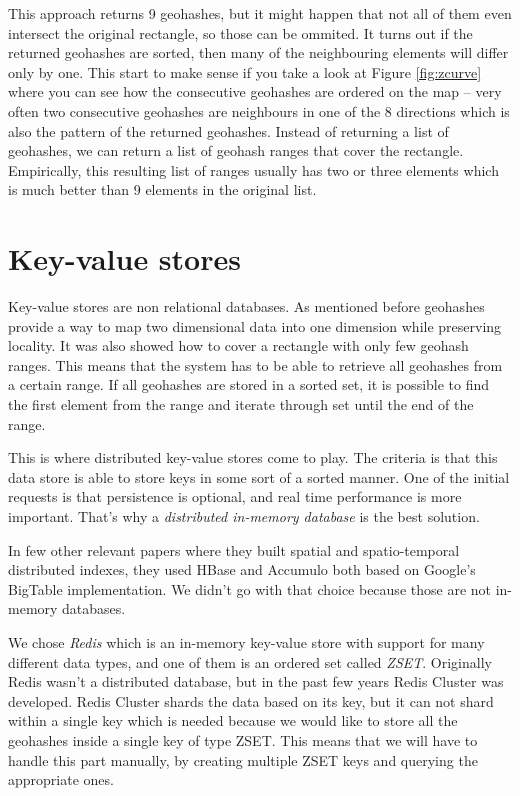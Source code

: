 \documentclass[times, utf8, diplomski]{fer}
\begin{document}
This approach returns 9 geohashes, but it might happen that not all of them even intersect the original rectangle, so those can be ommited. It turns out if the returned geohashes are sorted, then many of the neighbouring elements will differ only by one. This start to make sense if you take a look at Figure \ref{fig:zcurve} where you can see how the consecutive geohashes are ordered on the map -- very often two consecutive geohashes are neighbours in one of the 8 directions which is also the pattern of the returned geohashes. Instead of returning a list of geohashes, we can return a list of geohash ranges that cover the rectangle. Empirically, this resulting list of ranges usually has two or three elements which is much better than 9 elements in the original list.

\section{Key-value stores}
Key-value stores are non relational databases.
As mentioned before geohashes provide a way to map two dimensional data into one dimension while preserving locality. It was also showed how to cover a rectangle with only few geohash ranges. This means that the system has to be able to retrieve all geohashes from a certain range. If all geohashes are stored in a sorted set, it is possible to find the first element from the range and iterate through set until the end of the range.

This is where distributed key-value stores come to play. The criteria is that this data store is able to store keys in some sort of a sorted manner. One of the initial requests is that persistence is optional, and real time performance is more important. That's why a \emph{distributed in-memory database} is the best solution.

In few other relevant papers where they built spatial \cite{spatialindex} and spatio-temporal \cite{spatiotemporal} distributed indexes, they used HBase and Accumulo both based on Google's BigTable implementation. We didn't go with that choice because those are not in-memory databases.

We chose \emph{Redis} which is an in-memory key-value store with support for many different data types, and one of them is an ordered set called \emph{ZSET}. Originally Redis wasn't a distributed database, but in the past few years Redis Cluster was developed. Redis Cluster shards the data based on its key, but it can not shard within a single key which is needed because we would like to store all the geohashes inside a single key of type ZSET. This means that we will have to handle this part manually, by creating multiple ZSET keys and querying the appropriate ones.
\end{document}
